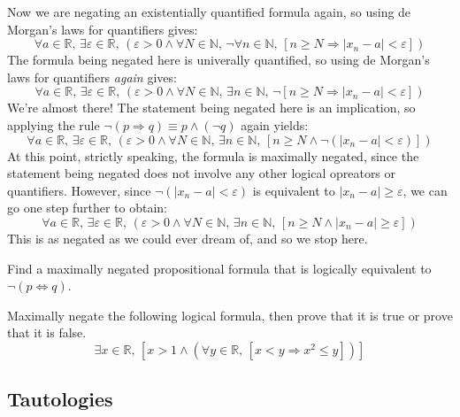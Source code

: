 \begin{example}
%
Now we are negating an existentially quantified formula again, so using de Morgan's laws for quantifiers gives:
\[ \forall a \in \mathbb{R},\, \exists \varepsilon \in \mathbb{R},\, (\varepsilon > 0 \wedge \forall N \in \mathbb{N},\, \neg \forall n \in \mathbb{N},\, [n \ge N \Rightarrow |x_n-a| < \varepsilon])\]
%
The formula being negated here is univerally quantified, so using de Morgan's laws for quantifiers \textit{again} gives:
\[ \forall a \in \mathbb{R},\, \exists \varepsilon \in \mathbb{R},\, (\varepsilon > 0 \wedge \forall N \in \mathbb{N},\, \exists n \in \mathbb{N},\, \neg [n \ge N \Rightarrow |x_n-a| < \varepsilon])\]
%
We're almost there! The statement being negated here is an implication, so applying the rule $\neg (p \Rightarrow q) \equiv p \wedge (\neg q)$ again yields:
\[ \forall a \in \mathbb{R},\, \exists \varepsilon \in \mathbb{R},\, (\varepsilon > 0 \wedge \forall N \in \mathbb{N},\, \exists n \in \mathbb{N},\, [n \ge N \wedge \neg (|x_n - a| < \varepsilon)])\]
%
At this point, strictly speaking, the formula is maximally negated, since the statement being negated does not involve any other logical opreators or quantifiers. However, since $\neg (|x_n-a| < \varepsilon)$ is equivalent to $|x_n - a| \ge \varepsilon$, we can go one step further to obtain:
\[ \forall a \in \mathbb{R},\, \exists \varepsilon \in \mathbb{R},\, (\varepsilon > 0 \wedge \forall N \in \mathbb{N},\, \exists n \in \mathbb{N},\, [n \ge N \wedge |x_n - a| \ge \varepsilon])\]
%
This is as negated as we could ever dream of, and so we stop here.
\end{example}

\begin{exercise}
Find a maximally negated propositional formula that is logically equivalent to $\neg (p \Leftrightarrow q)$.
\end{exercise}

\begin{exercise}
Maximally negate the following logical formula, then prove that it is true or prove that it is false.
\[ \exists x \in \mathbb{R},\, [x > 1 \wedge (\forall y \in \mathbb{R},\, [x < y \Rightarrow x^2 \le y])]\]
\end{exercise}

\subsection*{Tautologies}

